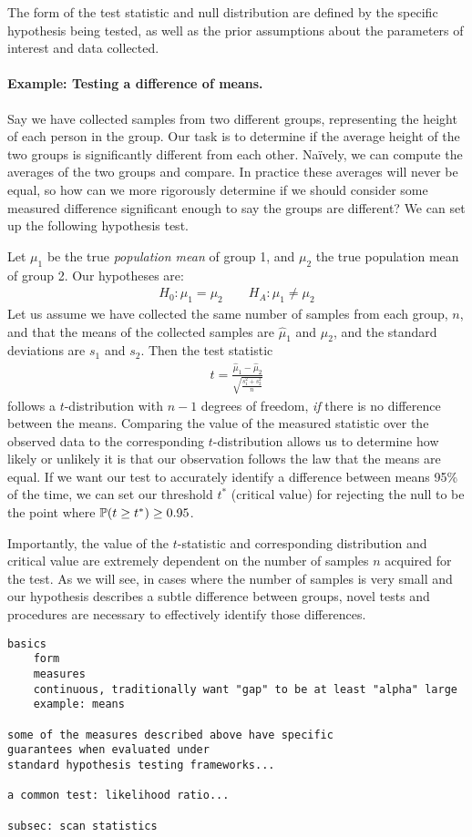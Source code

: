 The form of the test statistic and null distribution
are defined by the specific hypothesis being tested,
as well as the prior assumptions about the parameters
of interest and data collected.

\paragraph{Example: Testing a difference of means.} 
Say we have collected samples from two different groups,
representing the height of each person in the group.
Our task is to determine if the average height
of the two groups is significantly different from each other.
Na\"ively, we can compute the averages of the two groups and compare.
In practice these averages will never be equal, so how can we 
more rigorously determine if we should consider some measured difference
significant enough to say the groups are different?
We can set up the following hypothesis test.

Let $\mu_1$ be the true \textit{population mean} of group 1,
and $\mu_2$ the true population mean of group 2.
Our hypotheses are:
\begin{align}
H_0: \mu_1 = \mu_2 \qquad H_A: \mu_1 \neq \mu_2
\end{align}
Let us assume we have collected the same number of samples from each group,
$n$, and that the means of the collected samples are $\hat{\mu}_1$ and $\hat{\mu}_2$,
and the standard deviations are $s_1$ and $s_2$.
Then the test statistic
\begin{align}
t = \frac{\hat{\mu}_1 - \hat{\mu}_2}{\sqrt{\frac{s_1^2 + s_2^2}{n}}}
\end{align}
follows a $t$-distribution with $n-1$ degrees of freedom,
\textit{if} there is no difference between the means.
Comparing the value of the measured statistic over the observed data
to the corresponding $t$-distribution allows
us to determine how likely or unlikely it is that 
our observation follows the law that the means are equal.
If we want our test to accurately identify
a difference between means 95\% of the time,
we can set our threshold $t^*$ (critical value) for rejecting the null
to be the point where $\mathbb{P}(t \geq t^*) \geq 0.95$.

Importantly, the value of the $t$-statistic and corresponding
distribution and critical value are extremely
dependent on the number of samples $n$ acquired for the test.
As we will see, in cases where the number of samples is 
very small and our hypothesis describes 
a subtle difference between groups,
novel tests and procedures are necessary
to effectively identify those differences.





\begin{verbatim}
basics
    form
    measures
    continuous, traditionally want "gap" to be at least "alpha" large
    example: means

some of the measures described above have specific 
guarantees when evaluated under
standard hypothesis testing frameworks...

a common test: likelihood ratio...

subsec: scan statistics
\end{verbatim}

